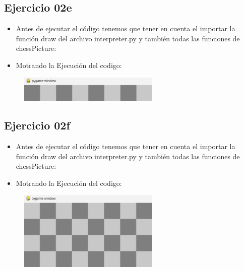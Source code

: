 \documentclass{article}
\begin{document}
	\subsection{Ejercicio 02e}
	\begin{itemize}	
		\item Antes de ejecutar el código tenemos que tener en cuenta el importar la función draw del archivo interpreter.py y también todas las funciones de chessPicture:
	\end{itemize}	

		

	\begin{itemize}	
		\item Motrando la Ejecución del codigo:
	\end{itemize}	

	\begin{figure}[H]
		\centering
		\includegraphics[width=0.6\textwidth,keepaspectratio]{img/Ejercicio2e.png}
	\end{figure}

	\subsection{Ejercicio 02f}
	\begin{itemize}	
		\item Antes de ejecutar el código tenemos que tener en cuenta el importar la función draw del archivo interpreter.py y también todas las funciones de chessPicture:
	\end{itemize}	

		

	\begin{itemize}	
		\item Motrando la Ejecución del codigo:
	\end{itemize}	

	\begin{figure}[H]
		\centering
		\includegraphics[width=0.6\textwidth,keepaspectratio]{img/Ejercicio2f.png}
	\end{figure}
\end{document}
